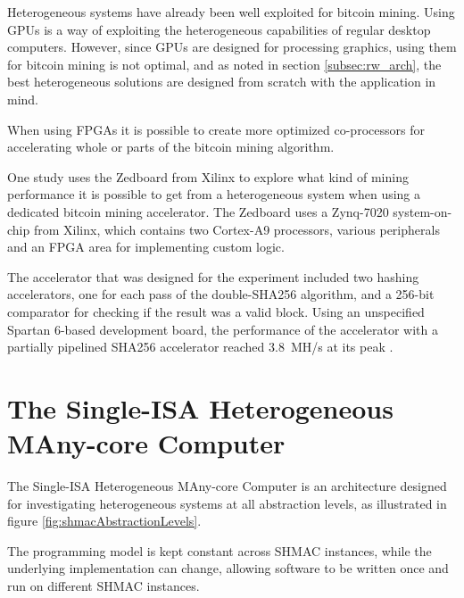 Heterogeneous systems have already been well exploited for bitcoin mining. Using GPUs is a way of exploiting
the heterogeneous capabilities of regular desktop computers. However, since GPUs are designed for
processing graphics, using them for bitcoin mining is not optimal, and as noted in section \ref{subsec:rw_arch},
the best heterogeneous solutions are designed from scratch with the application in mind.

When using FPGAs it is possible to create more optimized co-processors for accelerating
whole or parts of the bitcoin mining algorithm.

One study uses the Zedboard from Xilinx to explore what kind of mining performance it is possible to
get from a heterogeneous system when using a dedicated bitcoin mining accelerator. The Zedboard
uses a Zynq-7020 system-on-chip from Xilinx, which contains two Cortex-A9 processors, various
peripherals and an FPGA area for implementing custom logic.

The accelerator that was designed for the experiment included two hashing accelerators, one
for each pass of the double-SHA256 algorithm, and a 256-bit comparator for checking if the
result was a valid block. Using an unspecified Spartan 6-based development board, the
performance of the accelerator with a partially pipelined SHA256 accelerator reached
3.8~MH/s at its peak \cite{xcell-bitcoin}.


\section{The Single-ISA Heterogeneous MAny-core Computer}
\label{sec:shmac}

The Single-ISA Heterogeneous MAny-core Computer is an architecture designed for investigating heterogeneous
systems at all abstraction levels, as illustrated in figure \ref{fig:shmacAbstractionLevels}.

The programming model is kept constant across SHMAC instances, while the underlying implementation can change,
allowing software to be written once and run on different SHMAC instances.

